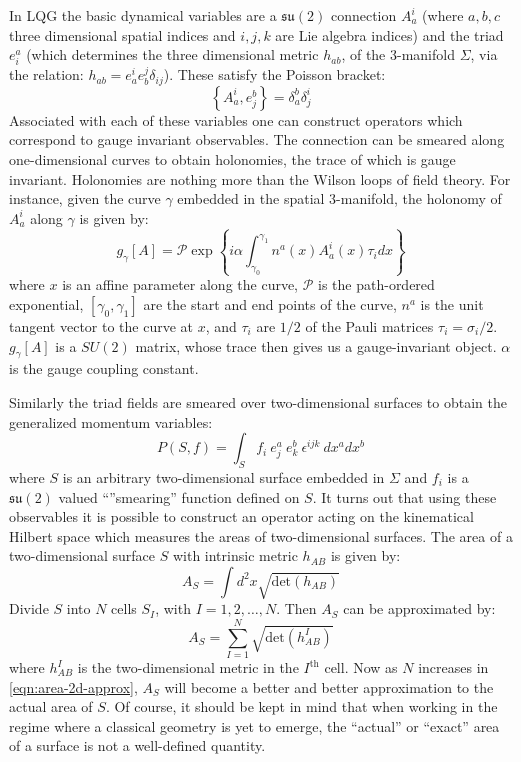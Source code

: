 \documentclass[11pt,a4paper,nofootinbib]{revtex4-1}
\newcommand{\mc}[1]{\mathcal{#1}}
\newcommand{\mf}[1]{\mathfrak{#1}}
\begin{document}
In LQG the basic dynamical variables are \cite{Ashtekar2004Background} a $ \mf{su}(2) $ connection $ A_a^i $ (where $ a,b,c $ three dimensional spatial indices and $ i,j,k $ are Lie algebra indices) and the triad  $ e^a_i $ (which determines the three dimensional metric $ h_{ab} $, of the 3-manifold $ \Sigma $, via the relation: $ h_{ab} = e_a^i e_b^j \delta_{ij} $). These satisfy the Poisson bracket:
\begin{equation}\label{eqn:poisson-bracket}
	\left\{ A_a^i, e^b_j \right\} = \delta^b_a \delta^i_j
\end{equation}
Associated with each of these variables one can construct operators which correspond to gauge invariant observables. The connection can be smeared along one-dimensional curves to obtain holonomies, the trace of which is gauge invariant. Holonomies are nothing more than the Wilson loops of field theory. For instance, given the curve $ \gamma $ embedded in the spatial 3-manifold, the holonomy of $ A_a^i $ along $ \gamma $ is given by:
\begin{equation}\label{eqn:holonomy}
	g_\gamma[A] = \mc{P} \exp \left\{ i \alpha \int_{\gamma_0}^{\gamma_1} n^a(x) A_a^i(x) \tau_i dx  \right\}
\end{equation}
where $ x $ is an affine parameter along the curve, $ \mc{P} $ is the path-ordered exponential, $ [\gamma_0, \gamma_1] $ are the start and end points of the curve, $ n^a $ is the unit tangent vector to the curve at $ x $, and $ \tau_i $ are $ 1/2 $ of the Pauli matrices $ \tau_i = \sigma_i/2 $. $ g_\gamma[A] $ is a $ SU(2) $ matrix, whose trace then gives us a gauge-invariant object. $ \alpha $ is the gauge coupling constant.

Similarly the triad fields are smeared over two-dimensional surfaces to obtain the generalized momentum variables:
\begin{equation}\label{eqn:triad}
P(S, f) = \int_S f_i~e^a_j~e^b_k~\epsilon^{ijk}~dx^a dx^b
\end{equation}
where $ S $ is an arbitrary two-dimensional surface embedded in $ \Sigma $ and $ f_i $ is a $ \mf{su}(2) $ valued ``''smearing'' function defined on $ S $. It turns out that using these observables it is possible to construct an operator acting on the kinematical Hilbert space which measures the areas of two-dimensional surfaces. The area of a two-dimensional surface $ S $ with intrinsic metric $ h_{AB} $ is given by:
\begin{equation}\label{eqn:area-2d}
	A_S = \int d^2 x \sqrt{\text{det}(h_{AB})}
\end{equation}
Divide $ S $ into $ N $ cells $ S_I $, with $ I = 1,2,\ldots,N $. Then $ A_S $ can be approximated by:
\begin{equation}\label{eqn:area-2d-approx}
	A_S = \sum_{I=1}^N \sqrt{\text{det}(h^I_{AB})}
\end{equation}
where $ h^I_{AB} $ is the two-dimensional metric in the $ I^\text{th} $ cell. Now as $ N $ increases in \eqref{eqn:area-2d-approx}, $ A_S $ will become a better and better approximation to the actual area of $ S $. Of course, it should be kept in mind that when working in the regime where a classical geometry is yet to emerge, the ``actual'' or ``exact'' area of a surface is not a well-defined quantity.
\end{document}
